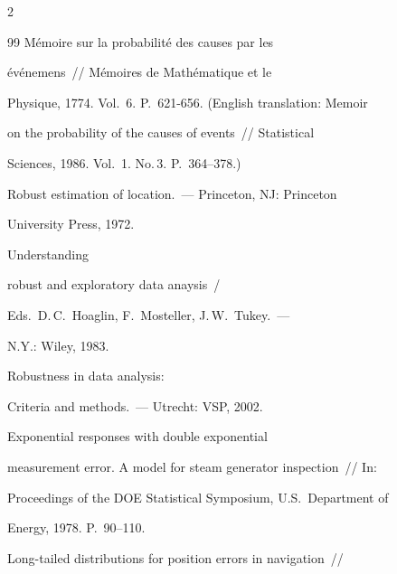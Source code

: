 \begin{multicols}{2}
{{\begin{thebibliography}{99}
M{\'e}moire sur la probabilit{\'e} des causes par les


{\'e}v{\'e}nemens~// M{\'e}moires de Math{\'e}matique et le


Physique, 1774. Vol.~6. P.~621-656. (English translation: Memoir


on the probability of the causes of events~// Statistical


Sciences, 1986. Vol.~1. No.\,3. P.~364--378.)









Robust estimation of location.~--- Princeton, NJ:  Princeton


University Press, 1972.







Understanding


robust and exploratory data anaysis~/


Eds.\ D.\,C.~Hoaglin, F.~Mosteller, J.\,W.~Tukey.~---


 N.Y.: Wiley, 1983.


 






Robustness in data analysis:


Criteria and methods.~--- Utrecht: VSP,  2002.









Exponential responses with double exponential


measurement error. A model for steam generator inspection~// In: 


Proceedings of the DOE Statistical Symposium, U.S.\ Department of


Energy, 1978. P.~90--110.









Long-tailed distributions for position errors in navigation~//



\end{thebibliography}}}
\end{multicols}
